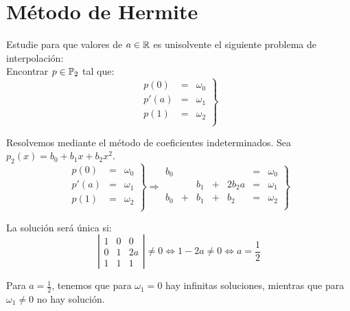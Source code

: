 \section{Método de Hermite}

\begin{ejemplo}
    Estudie para que valores de $a\in \mathbb{R}$ es unisolvente el siguiente problema de interpolación:\\
    Encontrar $p\in \mathbb{P}_2$ tal que:
    \begin{equation*}
        \left.\begin{array}{ccc}
            p(0) &=& \omega_0  \\
            p'(a) &=& \omega_1  \\
            p(1) &=& \omega_2  \\
        \end{array}\right\}
    \end{equation*}

    Resolvemos mediante el método de coeficientes indeterminados. Sea $p_2(x)=b_0 + b_1x + b_2x^2$.
    \begin{equation*}
        \left.\begin{array}{ccc}
            p(0) &=& \omega_0  \\
            p'(a) &=& \omega_1  \\
            p(1) &=& \omega_2  \\
        \end{array}\right\}
        \Longrightarrow
        \left.\begin{array}{rrrrrcc}
            b_0&&&& &=& \omega_0  \\
            &&b_1&+&2b_2a &=& \omega_1  \\
            b_0&+&b_1&+&b_2 &=& \omega_2  \\
        \end{array}\right\}
    \end{equation*}

    La solución será única si:
    \begin{equation*}
        \left|\begin{array}{ccc}
            1 & 0 & 0 \\
            0 & 1 & 2a \\
            1 & 1 & 1
        \end{array}\right| \neq 0 \Longleftrightarrow 1-2a \neq 0 \Longleftrightarrow a=\frac{1}{2}
    \end{equation*}

    Para $a=\frac{1}{2}$, tenemos que para $\omega_1=0$ hay infinitas soluciones, mientras que para $\omega_1\neq 0$ no hay solución.
\end{ejemplo}

